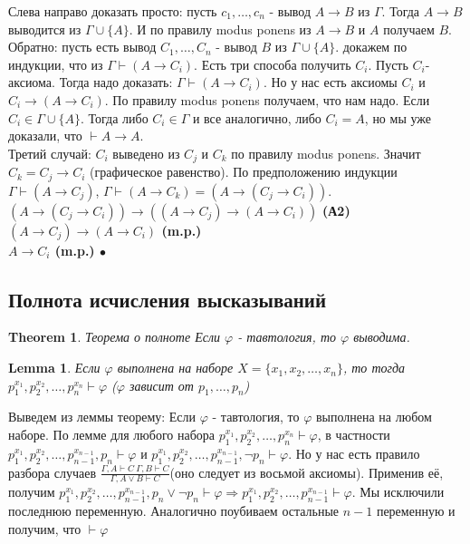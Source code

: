 \documentclass[a4paper]{article}
\theoremstyle{plain}
\newtheorem{theorem}{Theorem}
\newtheorem{lem}{Lemma}
\theoremstyle{remark}
\theoremstyle{definition}
\renewenvironment{proof}{{\bfseries Proof}}{$\bullet$}
\begin{document}
\begin{proof}
	Слева направо доказать просто: пусть $c_1, \ldots, c_n$ - вывод $A \rightarrow B$ из $\Gamma$. Тогда $A\rightarrow B$ выводится из $\Gamma \cup \{A\}$. И по правилу modus ponens из $A \rightarrow B$ и $A$ получаем $B$. \\
	Обратно: пусть есть вывод $C_1, \ldots, C_n$ - вывод $B$ из $\Gamma \cup \{A\}$. докажем по индукции, что из $\Gamma \vdash (A \rightarrow C_i)$. Есть три способа получить $C_i$. Пусть $C_i$- аксиома. Тогда надо доказать: $\Gamma \vdash (A \rightarrow C_i)$. Но у нас есть аксиомы $C_i$ и $C_i \rightarrow (A \rightarrow C_i)$. По правилу modus ponens получаем, что нам надо. Если $C_i \in \Gamma \cup \{A\}$. Тогда либо $C_i \in \Gamma$ и все аналогично, либо $C_i = A$, но мы уже доказали, что $\vdash A \rightarrow A$.	\\
	Третий случай: $C_i$ выведено из $C_j$ и $C_k$ по правилу modus ponens. Значит $C_k = C_j \rightarrow C_i$ (графическое равенство). По предположению индукции $\Gamma \vdash (A \rightarrow C_j)$, $\Gamma \vdash (A \rightarrow C_k) = (A \rightarrow (C_j \rightarrow C_i))$. \\
	$(A \rightarrow(C_j \rightarrow C_i)) \rightarrow ((A \rightarrow C_j) \rightarrow (A \rightarrow C_i))$ \bf{(А2)} \\
	$(A \rightarrow C_j) \rightarrow (A \rightarrow C_i)$ \bf{(m.p.)} \\
	$A \rightarrow C_i$ \bf{(m.p.)}
\end{proof}
\subsection{Полнота исчисления высказываний}
\begin{theorem}{Теорема о полноте}
	\newline
	Если $\varphi$ - тавтология, то $\varphi$ выводима.
\end{theorem}

\begin{lem}
	Если $\varphi$ выполнена на наборе $X = \{x_1,x_2, \ldots, x_n\}$, то тогда $p_1^{x_1}, p_2^{x_2}, \ldots, p_n^{x_n} \vdash \varphi$ ($\varphi$ зависит от $p_1, \ldots, p_n$)
\end{lem}

Выведем из леммы теорему: \newline
Если $\varphi$ - тавтология, то $\varphi$ выполнена на любом наборе. По лемме для любого набора $p_1^{x_1}, p_2^{x_2}, \ldots, p_n^{x_n} \vdash \varphi$, в частности $p_1^{x_1}, p_2^{x_2}, \ldots, p_{n-1}^{x_{n-1}}, p_n \vdash \varphi$ и $p_1^{x_1}, p_2^{x_2}, \ldots, p_{n-1}^{x_{n-1}}, \lnot p_n \vdash \varphi$. Но у нас есть правило разбора случаев $\frac{\Gamma,A\vdash C\ \Gamma,B\vdash C}{\Gamma, A\lor B \vdash C}$(оно следует из восьмой аксиомы). Применив её, получим $p_1^{x_1}, p_2^{x_2}, \ldots, p_{n-1}^{x_{n-1}}, p_n \lor \lnot p_n \vdash \varphi \Rightarrow p_1^{x_1}, p_2^{x_2}, \ldots, p_{n-1}^{x_{n-1}} \vdash \varphi$. Мы исключили последнюю переменную. Аналогично поубиваем остальные $n-1$ переменную и получим, что $\vdash \varphi$
\end{document}
